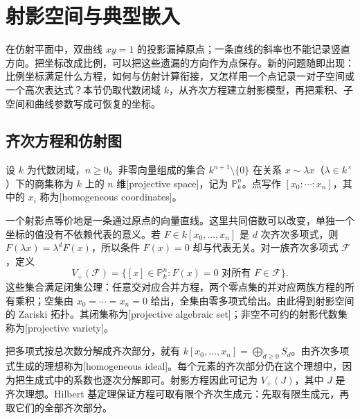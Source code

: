 
% 
% 

\section{射影空间与典型嵌入}
\label{g5:sec:0103}

在仿射平面中，双曲线 \(xy=1\) 的投影漏掉原点；一条直线的斜率也不能记录竖直方向。把坐标改成比例，可以把这些遗漏的方向作为点保存。新的问题随即出现：比例坐标满足什么方程，如何与仿射计算衔接，又怎样用一个点记录一对子空间或一个高次表达式？本节仍取代数闭域 \(k\)，从齐次方程建立射影模型，再把乘积、子空间和曲线参数写成可恢复的坐标。

\subsection{齐次方程和仿射图}
\label{g5:subsec:0103:01}

\begin{definition}
\label{g5:def:projective-space}
	设 \(k\) 为代数闭域，\(n\geq0\)。非零向量组成的集合 \(k^{n+1}\setminus\{0\}\) 在关系 \(x\sim\lambda x\)（\(\lambda\in k^\times\)）下的商集称为 \(k\) 上的 \(n\) 维[projective space]，记为 \(\mathbb P^n_k\)。点写作 \([x_0:\cdots:x_n]\)，其中的 \(x_i\) 称为[homogeneous coordinates]。
\end{definition}

一个射影点等价地是一条通过原点的向量直线。这里共同倍数可以改变，单独一个坐标的值没有不依赖代表的意义。若 \(F\in k[x_0,\ldots,x_n]\) 是 \(d\) 次齐次多项式，则 \(F(\lambda x)=\lambda^dF(x)\)，所以条件 \(F(x)=0\) 却与代表无关。对一族齐次多项式 \(\mathcal F\)，定义
\[
	V_+(\mathcal F)=\{[x]\in\mathbb P^n_k:F(x)=0\text{ 对所有 }F\in\mathcal F\}.
\]
这些集合满足闭集公理：任意交对应合并方程，两个零点集的并对应两族方程的所有乘积；空集由 \(x_0=\cdots=x_n=0\) 给出，全集由零多项式给出。由此得到射影空间的 Zariski 拓扑。其闭集称为[projective algebraic set]；非空不可约的射影代数集称为[projective variety]。

把多项式按总次数分解成齐次部分，就有 \(k[x_0,\ldots,x_n]=\bigoplus_{d\geq0}S_d\)。由齐次多项式生成的理想称为[homogeneous ideal]。每个元素的齐次部分仍在这个理想中，因为把生成式中的系数也逐次分解即可。射影方程因此可记为 \(V_+(J)\)，其中 \(J\) 是齐次理想。Hilbert 基定理保证方程可取有限个齐次生成元：先取有限生成元，再取它们的全部齐次部分。

